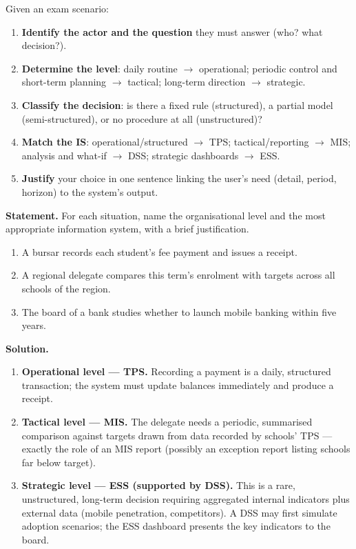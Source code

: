 \documentclass[11pt]{article}
\begin{document}
\begin{methode}
Given an exam scenario:
\begin{enumerate}
\item \textbf{Identify the actor and the question} they must answer (who? what decision?).
\item \textbf{Determine the level}: daily routine $\rightarrow$ operational; periodic control and short-term planning $\rightarrow$ tactical; long-term direction $\rightarrow$ strategic.
\item \textbf{Classify the decision}: is there a fixed rule (structured), a partial model (semi-structured), or no procedure at all (unstructured)?
\item \textbf{Match the IS}: operational/structured $\rightarrow$ TPS; tactical/reporting $\rightarrow$ MIS; analysis and what-if $\rightarrow$ DSS; strategic dashboards $\rightarrow$ ESS.
\item \textbf{Justify} your choice in one sentence linking the user's need (detail, period, horizon) to the system's output.
\end{enumerate}
\end{methode}

\begin{exoresolu}
\textbf{Statement.} For each situation, name the organisational level and the most appropriate information system, with a brief justification.
\begin{enumerate}
\item A bursar records each student's fee payment and issues a receipt.
\item A regional delegate compares this term's enrolment with targets across all schools of the region.
\item The board of a bank studies whether to launch mobile banking within five years.
\end{enumerate}
\tcblower
\textbf{Solution.}
\begin{enumerate}
\item \textbf{Operational level --- TPS.} Recording a payment is a daily, structured transaction; the system must update balances immediately and produce a receipt.
\item \textbf{Tactical level --- MIS.} The delegate needs a periodic, summarised comparison against targets drawn from data recorded by schools' TPS --- exactly the role of an MIS report (possibly an exception report listing schools far below target).
\item \textbf{Strategic level --- ESS (supported by DSS).} This is a rare, unstructured, long-term decision requiring aggregated internal indicators plus external data (mobile penetration, competitors). A DSS may first simulate adoption scenarios; the ESS dashboard presents the key indicators to the board.
\end{enumerate}
\end{exoresolu}
\end{document}
